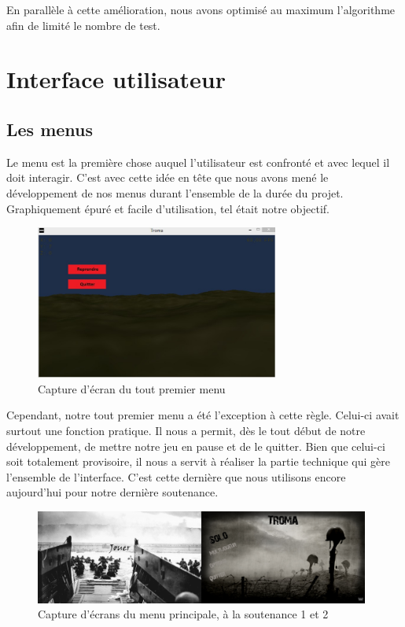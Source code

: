\documentclass[11pt]{report}
\begin{document}
En parallèle à cette amélioration, nous avons optimisé au maximum l'algorithme afin de limité le nombre de test.

\chapter{Interface utilisateur}

\section{Les menus}

Le menu est la première chose auquel l'utilisateur est confronté et avec lequel il doit interagir. C'est avec cette idée en tête que nous avons mené le développement de nos menus durant l'ensemble de la durée du projet. Graphiquement épuré et facile d'utilisation, tel était notre objectif.

\begin{figure}[htbp]
\centering
\includegraphics[width=8cm]{menu-pause-0.jpg}
\caption{Capture d'écran du tout premier menu}
\end{figure}

Cependant, notre tout premier menu a été l'exception à cette règle. Celui-ci avait surtout une fonction pratique. Il nous a permit, dès le tout début de notre développement, de mettre notre jeu en pause et de le quitter. Bien que celui-ci soit totalement provisoire, il nous a servit à réaliser la partie technique qui gère l'ensemble de l'interface. C'est cette dernière que nous utilisons encore aujourd'hui pour notre dernière soutenance.

\begin{figure}[htbp]
\centering
\includegraphics[width=11cm]{main-menu-1et2.png}
\caption{Capture d'écrans du menu principale, à la soutenance 1 et 2}
\end{figure}
\end{document}
